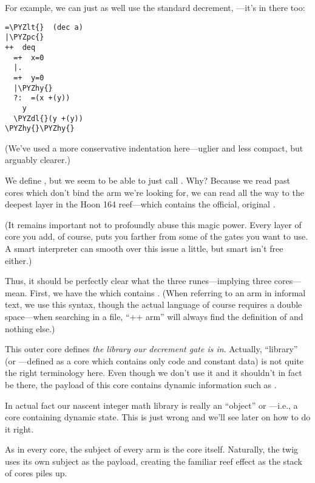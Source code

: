 For example, we can just as well use the standard decrement,
---it's in there too:

\begin{framed_shaded}
\begin{Verbatim}[fontsize=\relsize{-2.5},fontseries=b,commandchars=\\\{\}]
=\PYZlt{}  (dec a)
|\PYZpc{}
++  deq
  =+  x=0
  |.  
  =+  y=0
  |\PYZhy{}  
  ?:  =(x +(y))
    y
  \PYZdl{}(y +(y))
\PYZhy{}\PYZhy{}
\end{Verbatim}
\end{framed_shaded}

(We've used a more conservative indentation here---uglier and
less compact, but arguably clearer.)

We define , but we seem to be able to just call .  Why?
Because we read past cores which don't bind the arm we're looking
for, we can read all the way to the deepest layer in the Hoon 164
reef---which contains the official, original .

(It remains important not to profoundly abuse this magic power.
Every layer of core you add, of course, puts you farther from
some of the gates you want to use.  A smart interpreter can
smooth over this issue a little, but smart isn't free either.)

Thus, it should be perfectly clear what the three  runes---implying three cores---mean.  First, we have the \kode{\textbar{}\%} which
contains .  (When referring to an arm in informal text,
we use this syntax, though the actual language of course requires
a double space---when searching in a file, ``++  arm'' will always
find the definition of  and nothing else.)

This outer core defines \emph{the library our decrement gate is in}.
Actually, ``library'' (or ---defined as a core which
contains only code and constant data) is not quite the right
terminology here.  Even though we don't use it and it shouldn't
in fact be there, the payload of this core contains dynamic
information such as .

In actual fact our nascent integer math library  is really an
``object'' or ---i.e., a core containing dynamic state.  This
is just wrong and we'll see later on how to do it right.

As in every core, the subject of every arm is the core itself.
Naturally, the \kode{\textbar{}\%} twig uses its own subject as the payload,
creating the familiar reef effect as the stack of cores piles up.

